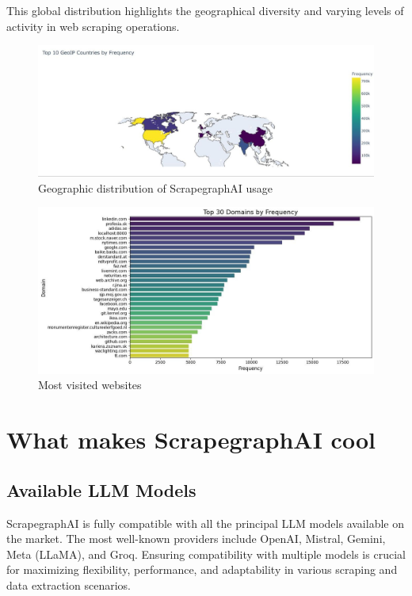 This global distribution highlights the geographical diversity and varying levels of activity in web scraping operations.

\begin{figure}[h!]
    \centering
    \includegraphics[scale=0.25]{Assets/countries.jpg}
    \caption{Geographic distribution of ScrapegraphAI usage}
    \label{fig:geographic-distribution}
\end{figure}

\begin{figure}[h!]
    \centering
    \includegraphics[scale=0.45]{Assets/websites.jpg}
    \caption{Most visited websites}
    \label{fig:enter-label}
\end{figure}
\section{What makes ScrapegraphAI  cool}
\subsection{Available LLM Models}

ScrapegraphAI is fully compatible with all the principal LLM models available on the market. The most well-known providers include OpenAI, Mistral, Gemini, Meta (LLaMA), and Groq. Ensuring compatibility with multiple models is crucial for maximizing flexibility, performance, and adaptability in various scraping and data extraction scenarios.

